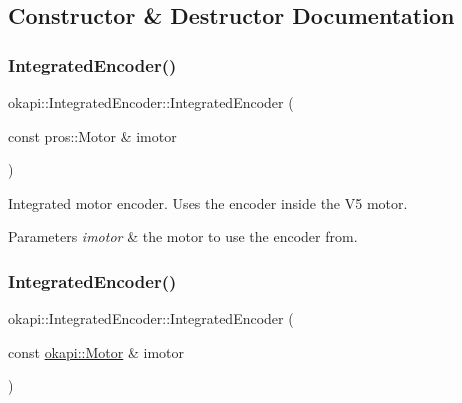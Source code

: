 \subsection{Constructor \& Destructor Documentation}
\mbox{\label{classokapi_1_1IntegratedEncoder_a286d2b7796770ea5a91f498687cbe858}} 
\subsubsection{\texorpdfstring{IntegratedEncoder()}{IntegratedEncoder()}\hspace{0.1cm}{\footnotesize\ttfamily [1/2]}}
{\footnotesize\ttfamily okapi\+::\+Integrated\+Encoder\+::\+Integrated\+Encoder (\begin{DoxyParamCaption}\item[{const pros\+::\+Motor \&}]{imotor }\end{DoxyParamCaption})\hspace{0.3cm}{\ttfamily [explicit]}}

Integrated motor encoder. Uses the encoder inside the V5 motor.


\begin{DoxyParams}{Parameters}
{\em imotor} & the motor to use the encoder from. \\
\hline
\end{DoxyParams}
\mbox{\label{classokapi_1_1IntegratedEncoder_a05d0256b51e3631d9ee9177c4eafcb99}} 
\subsubsection{\texorpdfstring{IntegratedEncoder()}{IntegratedEncoder()}\hspace{0.1cm}{\footnotesize\ttfamily [2/2]}}
{\footnotesize\ttfamily okapi\+::\+Integrated\+Encoder\+::\+Integrated\+Encoder (\begin{DoxyParamCaption}\item[{const \mbox{\hyperlink{classokapi_1_1Motor}{okapi\+::\+Motor}} \&}]{imotor }\end{DoxyParamCaption})}

